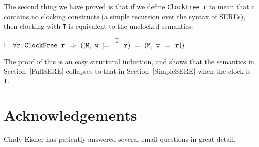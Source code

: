 \documentclass{llncs}
\newcommand{\T}{\texttt{\small\rm{T}}}
\newcommand{\sSem}[4]{(\tt{#1,~#2~\models^{\hspace*{-2.3mm}\raisebox{1mm}{\tt#3}}~#4})}
\renewcommand{\c}{{\hspace*{2.5mm}}}
\renewcommand{\t}[1]{\texttt{#1}}
\begin{document}
The second thing we have proved is that if we define \t{ClockFree~r} to mean
that \t{r} contains no clocking constructs (a simple recursion over the syntax of SEREs),
then clocking with \T{} is equivalent to the unclocked semantics.

\medskip

$\vdash~\forall{\t{r}}.~\t{ClockFree~r}~\Rightarrow~(\sSem{M}{w}{\T}{r}~=~\sSem{M}{w}{\c}{r})$

\medskip

The proof of this is an easy structural induction, and shows that the semantics in Section~\ref{FullSERE}
collapses to that in Section~\ref{SimpleSERE} when the clock is \T.

\section{Acknowledgements}

Cindy Eisner has patiently answered several email questions
in great detail.

{}
\end{document}
